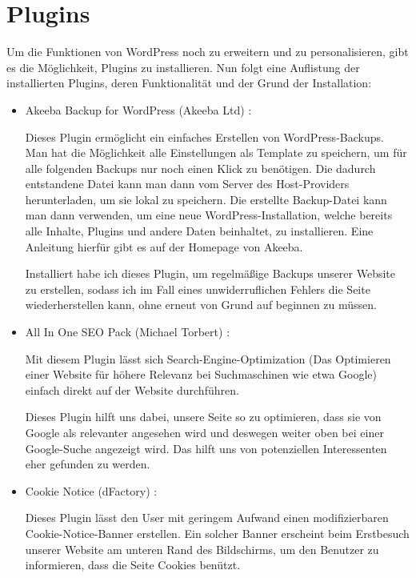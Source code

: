 \section{Plugins}
Um die Funktionen von WordPress noch zu erweitern und zu personalisieren, gibt es die Möglichkeit, Plugins zu installieren. Nun folgt eine Auflistung der installierten Plugins, deren Funktionalität und der Grund der Installation:
\begin{itemize}
    \item Akeeba Backup for WordPress (Akeeba Ltd) \citep{website:Akeeba}:

    Dieses Plugin ermöglicht ein einfaches Erstellen von WordPress-Backups. Man hat die Möglichkeit alle Einstellungen als Template zu speichern, um für alle folgenden Backups nur noch einen Klick zu benötigen. Die dadurch entstandene Datei kann man dann vom Server des Host-Providers herunterladen, um sie lokal zu speichern.
    Die erstellte Backup-Datei kann man dann verwenden, um eine neue WordPress-Installation, welche bereits alle Inhalte, Plugins und andere Daten beinhaltet, zu installieren.
    Eine Anleitung hierfür gibt es auf der Homepage von Akeeba. \citep{website:AkeebaInstructions}

    Installiert habe ich dieses Plugin, um regelmäßige Backups unserer Website zu erstellen, sodass ich im Fall eines unwiderruflichen Fehlers die Seite wiederherstellen kann, ohne erneut von Grund auf beginnen zu müssen.
    \item All In One SEO Pack (Michael Torbert) \citep{website:AllInOneSEO}:

    Mit diesem Plugin lässt sich Search-Engine-Optimization (Das Optimieren einer Website für höhere Relevanz bei Suchmaschinen wie etwa Google) einfach direkt auf der Website durchführen.

    Dieses Plugin hilft uns dabei, unsere Seite so zu optimieren, dass sie von Google als relevanter angesehen wird und deswegen weiter oben bei einer Google-Suche angezeigt wird. Das hilft uns von potenziellen Interessenten eher gefunden zu werden.

    \item Cookie Notice (dFactory) \citep{website:CookieNotice}:

    Dieses Plugin lässt den User mit geringem Aufwand einen modifizierbaren Cookie-Notice-Banner erstellen. Ein solcher Banner erscheint beim Erstbesuch unserer Website am unteren Rand des Bildschirms, um den Benutzer zu informieren, dass die Seite Cookies benützt.


\end{itemize}
